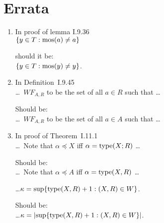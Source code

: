 \section{Errata}

\begin{enumerate}

\item
In proof of lemma I.9.36\\
\(\{y \in T: {\rm mos}(a) \neq a\}\)

should it be:\\
\(\{y \in T: {\rm mos}(y) \neq y\}\).

\item
In Definition~I.9.45 \\
\ldots\ \(WF_{A,R}\) to be the set of all \(a \in R\) such that \ldots

Should be:\\
\ldots\ \(WF_{A,R}\) to be the set of all \(a \in A\) such that \ldots

\item In proof of Theorem~I.11.1 \\
\ldots\ Note that \(\alpha \preccurlyeq X\) iff \(\alpha = \mathop{\mathrm{type}}(X;R)\) \ldots

Should be:\\
\ldots\ Note that \(\alpha \preccurlyeq A\) iff \(\alpha = \mathop{\mathrm{type}}(X,R)\) \ldots

\ldots \(\kappa = \sup\{\mathop{\mathrm{type}}(X, R) + 1 : (X, R) \in W\}\).

Should be:\\
\ldots \(\kappa = \left|\sup\{\mathop{\mathrm{type}}(X, R) + 1 : (X, R) \in W\}\right|\).

\end{enumerate}



\iftrue
 
\else
\fi


% 



\printindex



